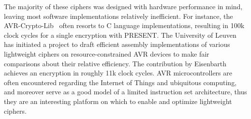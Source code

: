 \documentclass[11pt]{article}
\begin{document}
The majority of these ciphers was designed with hardware performance in mind, leaving most software implementations relatively inefficient. For instance, the AVR-Crypto-Lib~\cite{avr_crypto_lib} often resorts to C language implementations, resulting in 100k clock cycles for a single encryption with PRESENT. The University of Leuven has initiated a project to draft efficient assembly implementations of various lightweight ciphers on resource-constrained AVR devices to make fair comparisons about their relative efficiency. The contribution by Eisenbarth~\cite{eisenbarth2012compact} achieves an encryption in roughly 11k clock cycles.
AVR microcontrollers are often encountered regarding the Internet of Things and ubiquitous computing, and moreover serve as a good model of a limited instruction set architecture, thus they are an interesting platform on which to enable and optimize lightweight ciphers.
\end{document}
